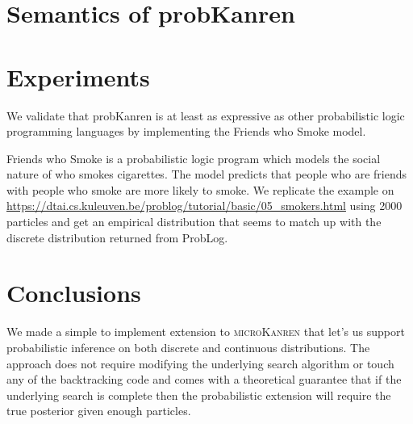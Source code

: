\documentclass[
]{ceurart}
\begin{document}
\section{Semantics of probKanren}

\section{Experiments}

We validate that probKanren is at least as expressive as other probabilistic
logic programming languages by implementing the Friends who Smoke model.

Friends who Smoke is a probabilistic logic program which models the
social nature of who smokes cigarettes. The model predicts that people
who are friends with people who smoke are more likely to smoke. We
replicate the example on
\url{https://dtai.cs.kuleuven.be/problog/tutorial/basic/05_smokers.html}
using 2000 particles and get an empirical distribution that seems to
match up with the discrete distribution returned from ProbLog.




\section{Conclusions}

We made a simple to implement extension to \textsc{microKanren} that
let's us support probabilistic inference on both discrete and
continuous distributions. The approach does not require modifying the
underlying search algorithm or touch any of the backtracking code and
comes with a theoretical guarantee that if the underlying search is
complete then the probabilistic extension will require the true
posterior given enough particles.

\end{document}
